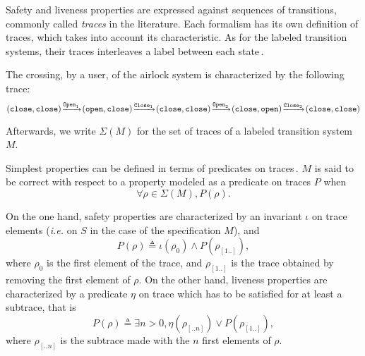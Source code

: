 Safety and liveness properties are expressed against sequences of transitions,
commonly called \emph{traces} in the literature.
%
Each formalism has its own definition of traces, which takes into account its
characteristic.
%
As for the labeled transition systems, their traces interleaves a label between
each state\,\cite{vijayaraghavan2015modular}.

\begin{example}
  The crossing, by a user, of the airlock system is characterized by the
  following trace:
  \[
    \footnotesize (\mathtt{close}, \mathtt{close})%
    \!\xrightarrow{\mathtt{Open}_1}\!(\mathtt{open}, \mathtt{close})%
    \!\xrightarrow{\mathtt{Close}_1}\!(\mathtt{close}, \mathtt{close})%
    \!\xrightarrow{\mathtt{Open}_2}\!(\mathtt{close}, \mathtt{open})%
    \!\xrightarrow{\mathtt{Close}_2}\!(\mathtt{close}, \mathtt{close})
  \]
\end{example}

Afterwards, we write \( \Sigma(M) \) for the set of traces of a labeled
transition system \( M \).

Simplest properties can be defined in terms of predicates on
traces\,\cite{alpern1987recognizing,schneider2000enforceable,basin2013enforceable}.
%
\( M \) is said to be correct with respect to a property modeled as a predicate
on traces \( P \) when
%
\[
  \forall \rho \in \Sigma(M), P(\rho).
\]

On the one hand, safety properties are characterized by an invariant \( \iota \)
on trace elements (\emph{i.e.} on \( S \) in the case of the specification
\( M \)), and
%
\[
  P(\rho) \triangleq \iota(\rho_0) \wedge P(\rho_{[1..]}),
\]
%
where \( \rho_0 \) is the first element of the trace, and \( \rho_{[1..]} \) is
the trace obtained by removing the first element of \( \rho \).
%
On the other hand, liveness properties are characterized by a predicate
\( \eta \) on trace which has to be satisfied for at least a subtrace, that is
%
\[
  P(\rho) \triangleq \exists n > 0, \eta(\rho_{[..n]}) \vee P(\rho_{[1..]}),
\]
%
where \( \rho_{[..n]} \) is the subtrace made with the \( n \) first elements of
\( \rho \).

